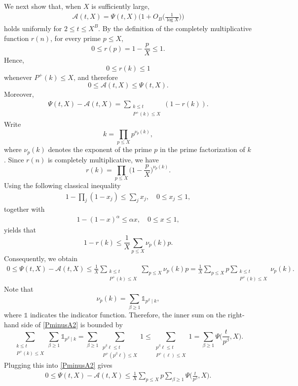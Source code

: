 \documentclass[12pt,reqno]{amsart}
\theoremstyle{definition}
\numberwithin{equation}{section}
\newcommand{\Bg}{\Big}
\newcommand{\mca}{\mathcal{A}}
\begin{document}
We next show that, when \(X\) is sufficiently large,
\begin{align}
    \label{APapproximate}
    \mca(t,X) = \Psi(t,X)\Bg(1+O_B\Bg(\frac{1}{\log X}\Bg) \Bg)
\end{align}
holds uniformly for \(2 \le t \le X^B\). By the definition of the completely multiplicative function \(r(n)\),
for every prime \(p\le X\),
\[
0\le r(p)=1-\frac{p}{X}\le 1.
\]
Hence,
\[
0\le r(k)\le 1
\]
whenever \(P^+(k)\le X\), and therefore
\[
0\le \mca(t,X)\le \Psi(t,X).
\]
Moreover,
\begin{align}
\label{PminusA}
    \Psi(t,X) - \mca(t,X) = \sum_{\substack{k \le t \\ P^+(k) \le X}} (1-r(k)).
\end{align}
Write
\[
k = \prod_{p \le X} p^{\nu_p(k)},
\]
where \(\nu_p(k)\) denotes the exponent of the prime \(p\) in the prime factorization of \(k\). Since \(r(n)\) is completely multiplicative, we have
\[
r(k) = \prod_{p \le X}\Bg(1-\frac{p}{X}\Bg)^{\nu_p(k)}.
\]
Using the following classical inequality
\begin{align}
    \label{classical1}
        1 - \prod_j (1-x_j) \le \sum_j x_j, \quad 0 \le x_j \le 1,
\end{align}
together with
\begin{align}
    \label{classical2}
    1-(1-x)^\alpha \le \alpha x, \quad 0 \le x \le 1,
\end{align}
yields that
\[
1-r(k) \le \frac{1}{X}\sum_{p \le X}\nu_p(k)p.
\]
Consequently, we obtain
\begin{align}
    \label{PminusA2}
    0 \le \Psi(t,X) - \mca(t,X) \le \frac{1}{X}\sum_{\substack{k\le t \\ P^+(k) \le X}} \sum_{p \le X} \nu_p(k)p =  \frac{1}{X} \sum_{p \le X}p \sum_{\substack{k\le t \\ P^+(k) \le X}}\nu_p(k).
\end{align}
Note that
\[
\nu_p(k) = \sum_{\beta \ge 1} \mathds{1}_{p^\beta \mid k},
\]
where \(\mathds{1}\) indicates the indicator function. Therefore, the inner sum on the right-hand side of \eqref{PminusA2} is bounded by
\[
\sum_{\substack{k\le t \\ P^+(k) \le X}}\sum_{\beta \ge 1} \mathds{1}_{p^\beta \mid k} =\sum_{\beta \ge 1} \sum_{\substack{p^\beta \ell \le t \\ P^+(p^\beta \ell) \le X}} 1 \le \sum_{\substack{p^\beta \ell \le t \\ P^+(\ell) \le X}} 1 =\sum_{\beta \ge 1} \Psi\Bg(\frac{t}{p^\beta},X\Bg).
\]
Plugging this into \eqref{PminusA2} gives 
\begin{align}
    \label{PminusA3}
    0 \le \Psi(t,X) - \mca(t,X) \le \frac{1}{X} \sum_{p \le X}p \sum_{\beta \ge 1} \Psi\Bg(\frac{t}{p^\beta},X\Bg).
\end{align}
\end{document}
